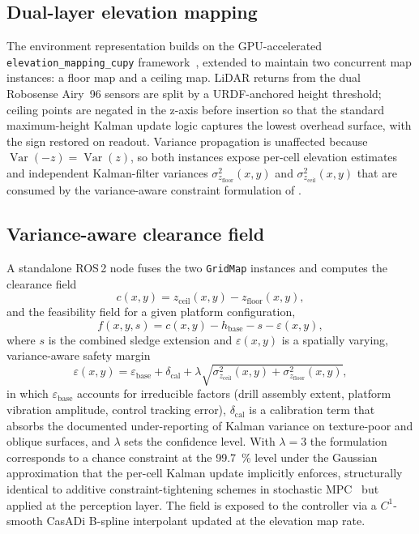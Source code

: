 \documentclass[11pt,a4paper]{article}
\begin{document}
\subsection{Dual-layer elevation mapping}
\label{sec:meth:mapping}

The environment representation builds on the GPU-accelerated \texttt{elevation\_mapping\_cupy} framework~\cite{mikiElevationMappingLocomotion2022}, extended to maintain two concurrent map instances: a floor map and a ceiling map. LiDAR returns from the dual Robosense Airy~96 sensors are split by a URDF-anchored height threshold; ceiling points are negated in the z-axis before insertion so that the standard maximum-height Kalman update logic captures the lowest overhead surface, with the sign restored on readout. Variance propagation is unaffected because $\operatorname{Var}(-z) = \operatorname{Var}(z)$, so both instances expose per-cell elevation estimates and independent Kalman-filter variances $\sigma^2_{z_\mathrm{floor}}(x, y)$ and $\sigma^2_{z_\mathrm{ceil}}(x, y)$ that are consumed by the variance-aware constraint formulation of .

\subsection{Variance-aware clearance field}
\label{sec:meth:constraint}

A standalone ROS\,2 node fuses the two \texttt{GridMap} instances and computes the clearance field
\begin{equation}
\label{eq:clearance}
c(x, y) = z_\mathrm{ceil}(x, y) - z_\mathrm{floor}(x, y),
\end{equation}
and the feasibility field for a given platform configuration,
\begin{equation}
\label{eq:feasibility}
f(x, y, s) = c(x, y) - h_\mathrm{base} - s - \varepsilon(x, y),
\end{equation}
where $s$ is the combined sledge extension and $\varepsilon(x, y)$ is a spatially varying, variance-aware safety margin
\begin{equation}
\label{eq:eps_probabilistic}
\varepsilon(x, y) = \varepsilon_\mathrm{base} + \delta_\mathrm{cal} + \lambda \sqrt{\sigma^2_{z_\mathrm{ceil}}(x, y) + \sigma^2_{z_\mathrm{floor}}(x, y)},
\end{equation}
in which $\varepsilon_\mathrm{base}$ accounts for irreducible factors (drill assembly extent, platform vibration amplitude, control tracking error), $\delta_\mathrm{cal}$ is a calibration term that absorbs the documented under-reporting of Kalman variance on texture-poor and oblique surfaces, and $\lambda$ sets the confidence level. With $\lambda = 3$ the formulation corresponds to a chance constraint at the \SI{99.7}{\percent} level under the Gaussian approximation that the per-cell Kalman update implicitly enforces, structurally identical to additive constraint-tightening schemes in stochastic MPC~\cite{hewingLearningBasedModelPredictive2020,lorenzenConstraintTighteningStabilityStochastic2016} but applied at the perception layer. The field is exposed to the controller via a $C^1$-smooth CasADi B-spline interpolant updated at the elevation map rate.
\end{document}
